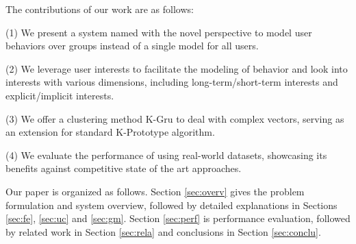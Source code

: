 The contributions of our work are as follows:

\stab(1) We present a system named \sys{} with the novel perspective to model user behaviors over groups instead of a single model for all users.

\stab(2) We leverage user interests to facilitate the modeling of \retg{} behavior and look into interests with various dimensions, including long-term/short-term interests and explicit/implicit interests.

\stab(3) We offer a clustering method K-Gru to deal with complex vectors, serving as an extension for standard K-Prototype algorithm.

\stab(4) We evaluate the performance of \sys{} using real-world datasets, showcasing its benefits against competitive state of the art approaches.



Our paper is organized as follows.
Section \ref{sec:overv} gives the problem formulation and system overview, followed by detailed explanations in Sections \ref{sec:fe}, \ref{sec:uc} and \ref{sec:gm}.
Section \ref{sec:perf} is performance evaluation, followed by
related work in Section \ref{sec:rela} and conclusions in Section \ref{sec:conclu}.











